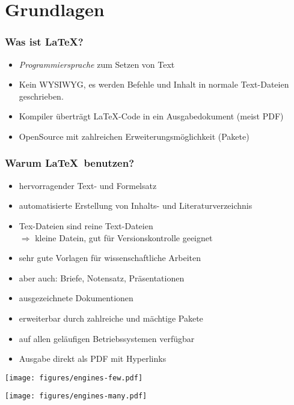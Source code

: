 \section{Grundlagen}
\begin{frame}
    \frametitle{Was ist \LaTeX?}
    \begin{itemize}
        \item \emph{Programmiersprache} zum Setzen von Text
        \item Kein WYSIWYG, es werden Befehle und Inhalt in normale Text-Dateien geschrieben.
        \item Kompiler überträgt \LaTeX-Code in ein Ausgabedokument (meist PDF)
        \item OpenSource mit zahlreichen Erweiterungsmöglichkeit (Pakete)
    \end{itemize}
\end{frame}
\begin{frame}
    \frametitle{Warum \LaTeX \ benutzen?}
    \begin{itemize}
        \item hervorragender Text- und Formelsatz
        \item automatisierte Erstellung von Inhalts- und Literaturverzeichnis
        \item Tex-Dateien sind reine Text-Dateien \\
              $\Rightarrow$ kleine Datein, gut für Versionskontrolle geeignet
        \item sehr gute Vorlagen für wissenschaftliche Arbeiten 
        \item aber auch: Briefe, Notensatz, Präsentationen 
        \item ausgezeichnete Dokumentionen
        \item erweiterbar durch zahlreiche und mächtige Pakete
        \item auf allen geläufigen Betriebssystemen verfügbar
        \item Ausgabe direkt als PDF mit Hyperlinks
    \end{itemize}
\end{frame}

\begin{frame}
  \centering
  \texttt{[image: figures/engines-few.pdf]}
  \hspace{2em}
\end{frame}
\begin{frame}
  \centering
  \texttt{[image: figures/engines-many.pdf]}
\end{frame}

